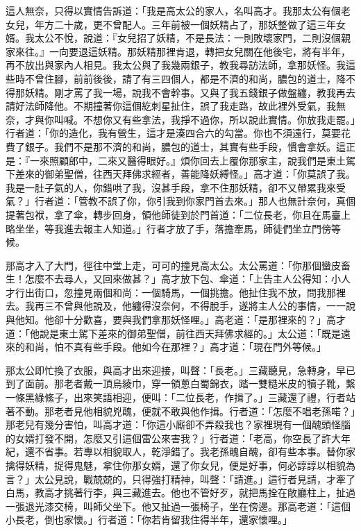 這人無奈，只得以實情告訴道：「我是高太公的家人，名叫高才。我那太公有個老女兒，年方二十歲，更不曾配人。三年前被一個妖精占了，那妖整做了這三年女婿。我太公不悅，說道：『女兒招了妖精，不是長法：一則敗壞家門，二則沒個親家來往。』一向要退這妖精。那妖精那裡肯退，轉把女兒關在他後宅，將有半年，再不放出與家內人相見。我太公與了我幾兩銀子，教我尋訪法師，拿那妖怪。我這些時不曾住腳，前前後後，請了有三四個人，都是不濟的和尚，膿包的道士，降不得那妖精。剛才罵了我一場，說我不會幹事。又與了我五錢銀子做盤纏，教我再去請好法師降他。不期撞著你這個紇刺星扯住，誤了我走路，故此裡外受氣，我無奈，才與你叫喊。不想你又有些拿法，我掙不過你，所以說此實情。你放我走罷。」行者道：「你的造化，我有營生，這才是湊四合六的勾當。你也不須遠行，莫要花費了銀子。我們不是那不濟的和尚，膿包的道士，其實有些手段，慣會拿妖。這正是：『一來照顧郎中，二來又醫得眼好。』煩你回去上覆你那家主，說我們是東土駕下差來的御弟聖僧，往西天拜佛求經者，善能降妖縛怪。」高才道：「你莫誤了我。我是一肚子氣的人，你錯哄了我，沒甚手段，拿不住那妖精，卻不又帶累我來受氣？」行者道：「管教不誤了你，你引我到你家門首去來。」那人也無計奈何，真個提著包袱，拿了傘，轉步回身，領他師徒到於門首道：「二位長老，你且在馬臺上略坐坐，等我進去報主人知道。」行者才放了手，落擔牽馬，師徒們坐立門傍等候。

那高才入了大門，徑往中堂上走，可可的撞見高太公。太公罵道：「你那個蠻皮畜生！怎麼不去尋人，又回來做甚？」高才放下包、傘道：「上告主人公得知：小人才行出街口，忽撞見兩個和尚：一個騎馬，一個挑擔。他扯住我不放，問我那裡去。我再三不曾與他說及，他纏得沒奈何，不得脫手，遂將主人公的事情，一一說與他知。他卻十分歡喜，要與我們拿那妖怪哩。」高老道：「是那裡來的？」高才道：「他說是東土駕下差來的御弟聖僧，前往西天拜佛求經的。」太公道：「既是遠來的和尚，怕不真有些手段。他如今在那裡？」高才道：「現在門外等候。」

那太公即忙換了衣服，與高才出來迎接，叫聲：「長老。」三藏聽見，急轉身，早已到了面前。那老者戴一頂烏綾巾，穿一領蔥白蜀錦衣，踏一雙糙米皮的犢子靴，繫一條黑綠絛子，出來笑語相迎，便叫：「二位長老，作揖了。」三藏還了禮，行者站著不動。那老者見他相貌兇醜，便就不敢與他作揖。行者道：「怎麼不唱老孫喏？」那老兒有幾分害怕，叫高才道：「你這小廝卻不弄殺我也？家裡現有一個醜頭怪腦的女婿打發不開，怎麼又引這個雷公來害我？」行者道：「老高，你空長了許大年紀，還不省事。若專以相貌取人，乾淨錯了。我老孫醜自醜，卻有些本事。替你家擒得妖精，捉得鬼魅，拿住你那女婿，還了你女兒，便是好事，何必諄諄以相貌為言？」太公見說，戰兢兢的，只得強打精神，叫聲：「請進。」這行者見請，才牽了白馬，教高才挑著行李，與三藏進去。他也不管好歹，就把馬拴在敞廳柱上，扯過一張退光漆交椅，叫師父坐下。他又扯過一張椅子，坐在傍邊。那高老道：「這個小長老，倒也家懷。」行者道：「你若肯留我住得半年，還家懷哩。」

